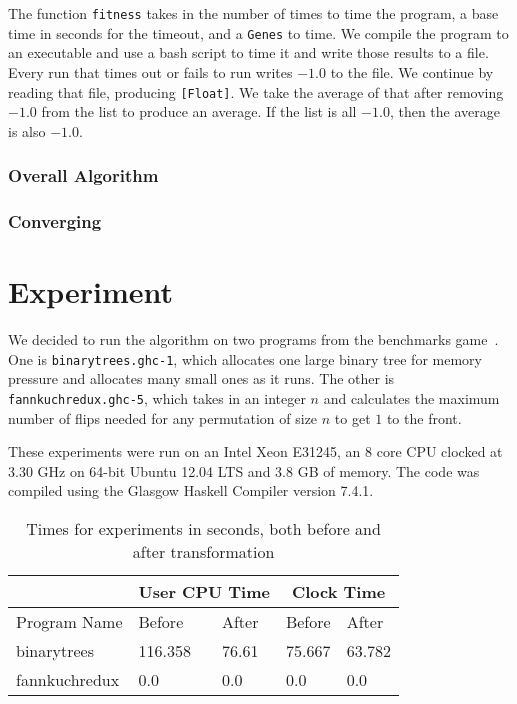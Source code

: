 \documentclass{sigplanconf}
\begin{document}
The function \lstinline!fitness! takes in the number of times to time the program, a base time in seconds for the timeout, and a \lstinline!Genes! to time. We compile the program to an executable and use a bash script to time it and write those results to a file. Every run that times out or fails to run writes $-1.0$ to the file. We continue by reading that file, producing \lstinline![Float]!. We take the average of that after removing $-1.0$ from the list to produce an average. If the list is all $-1.0$, then the average is also $-1.0$.
\subsubsection{Overall Algorithm}

\subsubsection{Converging}

\section{Experiment}\label{sec:expr}
We decided to run the algorithm on two programs from the benchmarks game~\cite{bgames}. One is \lstinline!binarytrees.ghc-1!, which allocates one large binary tree for memory pressure and allocates many small ones as it runs. The other is \lstinline!fannkuchredux.ghc-5!, which takes in an integer $n$ and calculates the maximum number of flips needed for any permutation of size $n$ to get $1$ to the front.

These experiments were run on an Intel Xeon E31245, an 8 core CPU clocked at 3.30 GHz on 64-bit Ubuntu 12.04 LTS and 3.8 GB of memory. The code was compiled using the Glasgow Haskell Compiler version 7.4.1.
\begin{table}[t]
\label{tab:expr}
\begin{tabular}{| l | l | l | l | l |}
\hline
 & \multicolumn{2}{|c|}{User CPU Time} & \multicolumn{2}{|c|}{Clock Time}\\
\hline
Program Name & Before & After & Before & After\\
\hline
binarytrees & 116.358 & 76.61 & 75.667 & 63.782\\
\hline
fannkuchredux & 0.0 & 0.0 & 0.0 & 0.0\\
\hline
\end{tabular}
\caption{Times for experiments in seconds, both before and after transformation}
\end{table}
\end{document}
